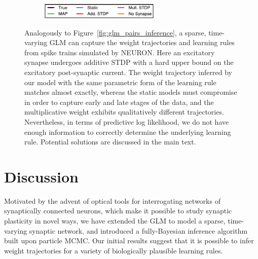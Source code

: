 \begin{figure}[t!]

  \begin{subfigure}[T]{\textwidth}
  \centering
  \includegraphics[height=2em]{figures/ch6/fig4_legend}    
  \end{subfigure}
  \caption[Synaptic weight trajectories for data generated from NEURON]{
    Analogously to Figure~\ref{fig:glm_pairs_inference}, a sparse,
    time-varying GLM can capture the weight trajectories and learning
    rules from spike trains simulated by NEURON. Here an excitatory
    synapse undergoes additive STDP with a hard upper bound on the
    excitatory post-synaptic current. The weight trajectory inferred by
    our model with the same parametric form of the learning rule
    matches almost exactly, whereas the static models must compromise
    in order to capture early and late stages of the data, and the
    multiplicative weight exhibits qualitatively different
    trajectories. Nevertheless, in terms of predictive log likelihood,
    we do not have enough information to correctly determine the
    underlying learning rule. Potential solutions are discussed in the
    main text.}
  \label{fig:pynn_pairs_inference}
\end{figure}


\section{Discussion}
Motivated by the advent of optical tools for interrogating networks of
synaptically connected neurons, which make it possible to study
synaptic plasticity in novel ways, we have extended the GLM to model a
sparse, time-varying synaptic network, and introduced a fully-Bayesian
inference algorithm built upon particle MCMC. Our initial results
suggest that it is possible to infer weight trajectories for a variety
of biologically plausible learning rules.

